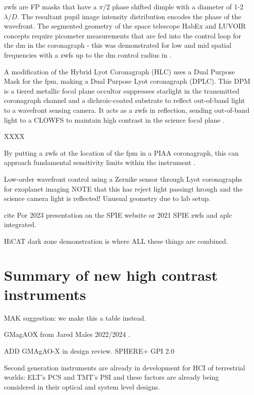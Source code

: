 \documentclass[letterpaper]{ar-1col}
\newcommand{\ld}{$\lambda/D$}
\begin{document}
\ac{zwfs} are FP masks that have a $\pi/2$ phase shifted dimple with a diameter of 1-2\ld{}.
%
The resultant pupil image intensity distribution encodes the phase of the wavefront.
%
The segmented geometry of the space telescope HabEx and LUVOIR concepts require picometer measurements that are fed into the control loop for the \ac{dm} in the coronagraph - this was demonstrated for low and mid spatial frequencies with a \ac{zwfs} up to the \ac{dm} control radius in \citet{Ruane20}.


A modification of the Hybrid Lyot Coronagraph (HLC) uses a Dual Purpose Mask for the \ac{fpm}, making a Dual Purpose Lyot coronagraph (DPLC).
%
This DPM is a tiered metallic focal plane occultor suppresses starlight in the transmitted coronagraph channel and a dichroic-coated substrate to reflect out-of-band light to a wavefront sensing camera.
%
It acts as a \ac{zwfs} in reflection, sending out-of-band light to a CLOWFS to maintain high contrast in the science focal plane \citep{Ruane23}.

XXXX

%
By putting a \ac{zwfs} at the location of the \ac{fpm} in a PIAA coronagraph, this can approach fundamental sensitivity limits within the instrument \citep{Haffert23}.


Low-order wavefront control using a Zernike sensor through Lyot coronagraphs for exoplanet imaging
\citep{Pourcelot22,Pourcelot23} NOTE that this has reject light passingt hrough and the science camera light is reflected! Unusual geometry due to lab setup.

cite Por 2023 presentation on the SPIE website or 2021 SPIE \ac{zwfs} and \ac{aplc} integrated. 


HiCAT dark zone demonstration \citep{Soummer22} is where ALL these things are combined. 


\section{Summary of new high contrast instruments}

MAK suggestion: we make this a table instead.



GMagAOX from Jared Males 2022/2024 \citep{Males22}.

ADD GMAgAO-X in design review.
SPHERE+
GPI 2.0


Second generation instruments are already in development for HCI of terrestrial worlds: ELT's PCS \citep{Kasper21} and TMT's PSI \citep{Jensen-Clem22,Fitzgerald22} and these factors are already being considered in their optical and system level designs.
\end{document}
